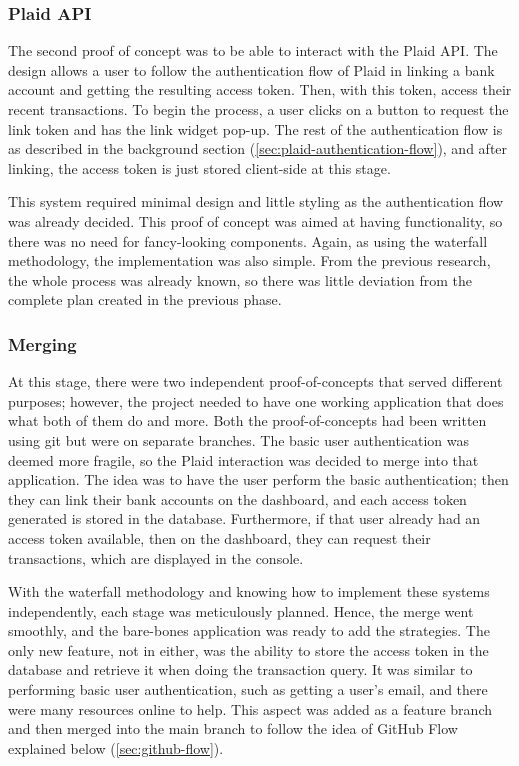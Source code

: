 \subsubsection{Plaid API}
The second proof of concept was to be able to interact with the Plaid API. The design allows a user to follow the authentication flow of Plaid in linking a bank account and getting the resulting access token. Then, with this token, access their recent transactions. To begin the process, a user clicks on a button to request the link token and has the link widget pop-up. The rest of the authentication flow is as described in the background section (\ref{sec:plaid-authentication-flow}), and after linking, the access token is just stored client-side at this stage.

This system required minimal design and little styling as the authentication flow was already decided. This proof of concept was aimed at having functionality, so there was no need for fancy-looking components. Again, as using the waterfall methodology, the implementation was also simple. From the previous research, the whole process was already known, so there was little deviation from the complete plan created in the previous phase.

\subsubsection{Merging}
At this stage, there were two independent proof-of-concepts that served different purposes; however, the project needed to have one working application that does what both of them do and more. Both the proof-of-concepts had been written using git but were on separate branches. The basic user authentication was deemed more fragile, so the Plaid interaction was decided to merge into that application. The idea was to have the user perform the basic authentication; then they can link their bank accounts on the dashboard, and each access token generated is stored in the database. Furthermore, if that user already had an access token available, then on the dashboard, they can request their transactions, which are displayed in the console.

With the waterfall methodology and knowing how to implement these systems independently, each stage was meticulously planned. Hence, the merge went smoothly, and the bare-bones application was ready to add the strategies. The only new feature, not in either, was the ability to store the access token in the database and retrieve it when doing the transaction query. It was similar to performing basic user authentication, such as getting a user's email, and there were many resources online to help. This aspect was added as a feature branch and then merged into the main branch to follow the idea of GitHub Flow explained below (\ref{sec:github-flow}).

